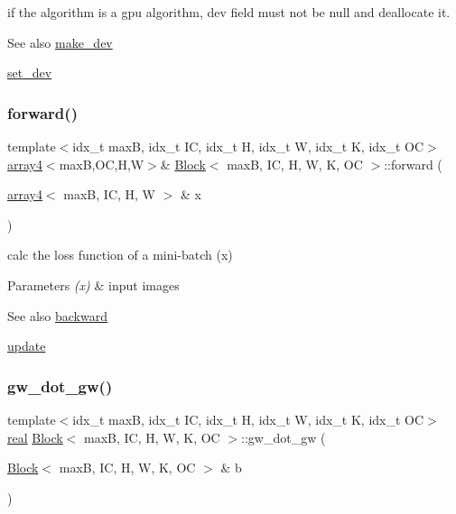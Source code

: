 if the algorithm is a gpu algorithm, dev field must not be null and deallocate it. 

\begin{DoxySeeAlso}{See also}
\hyperlink{structBlock_a971798b11f5cdc883880c0be2f143908}{make\+\_\+dev} 

\hyperlink{structBlock_a11093fd68976a6a40155cfb42397653c}{set\+\_\+dev} 
\end{DoxySeeAlso}
\mbox{\label{structBlock_a6a6ee3389b0ea5618109c9ca525ba9bf}} 
\subsubsection{\texorpdfstring{forward()}{forward()}}
{\footnotesize\ttfamily template$<$idx\+\_\+t maxB, idx\+\_\+t IC, idx\+\_\+t H, idx\+\_\+t W, idx\+\_\+t K, idx\+\_\+t OC$>$ \\
\hyperlink{structarray4}{array4}$<$maxB,OC,H,W$>$\& \hyperlink{structBlock}{Block}$<$ maxB, IC, H, W, K, OC $>$\+::forward (\begin{DoxyParamCaption}\item[{\hyperlink{structarray4}{array4}$<$ maxB, IC, H, W $>$ \&}]{x }\end{DoxyParamCaption})\hspace{0.3cm}{\ttfamily [inline]}}



calc the loss function of a mini-\/batch (x) 


\begin{DoxyParams}{Parameters}
{\em (x)} & input images \\
\hline
\end{DoxyParams}
\begin{DoxySeeAlso}{See also}
\hyperlink{structBlock_a86b4cafe64fbb5d045b7f2bc401d9ddc}{backward} 

\hyperlink{structBlock_a3d431dfca3c47701c1c41e471ea17c8b}{update} 
\end{DoxySeeAlso}
\mbox{\label{structBlock_a69a63d3357f60c7b097e97169b175445}} 
\subsubsection{\texorpdfstring{gw\+\_\+dot\+\_\+gw()}{gw\_dot\_gw()}}
{\footnotesize\ttfamily template$<$idx\+\_\+t maxB, idx\+\_\+t IC, idx\+\_\+t H, idx\+\_\+t W, idx\+\_\+t K, idx\+\_\+t OC$>$ \\
\hyperlink{vgg__util_8h_a1082d08aaa761215ec83e7149f27ad16}{real} \hyperlink{structBlock}{Block}$<$ maxB, IC, H, W, K, OC $>$\+::gw\+\_\+dot\+\_\+gw (\begin{DoxyParamCaption}\item[{\hyperlink{structBlock}{Block}$<$ maxB, IC, H, W, K, OC $>$ \&}]{b }\end{DoxyParamCaption})\hspace{0.3cm}{\ttfamily [inline]}}



